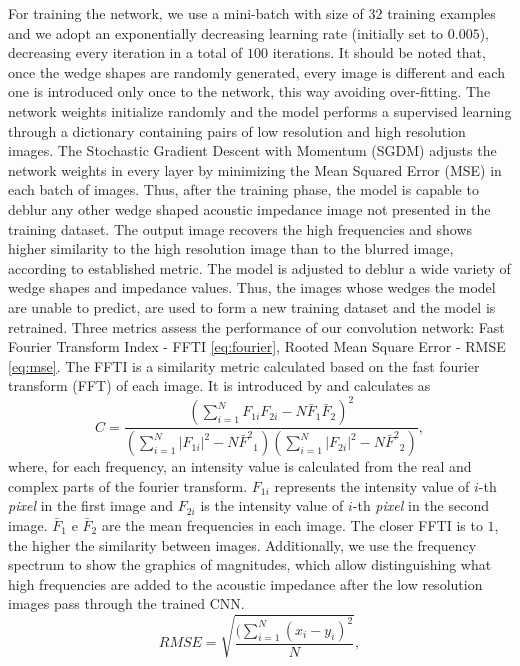 \documentclass[conference]{IEEEtran}
\begin{document}
For training the network, we use a mini-batch with size of $32$ training examples
and we adopt an exponentially decreasing learning rate (initially
set to $0.005$), decreasing every iteration in a total of $100$ iterations.
It should be noted that, once the wedge shapes are randomly generated, every image is different
and each one is introduced only once to the network, this way avoiding over-fitting.
The network weights initialize randomly and the model performs a supervised learning through a dictionary containing pairs of low resolution and high resolution images.
The Stochastic Gradient Descent with Momentum (SGDM) \cite{Ning1999} adjusts the network weights in every layer by minimizing the Mean Squared Error (MSE)
in each batch of images. Thus, after the training phase, the model is capable
to deblur any other wedge shaped acoustic impedance image not presented in the training dataset. The output
image recovers the high frequencies and shows higher similarity
to the high resolution image than to the blurred image, according to established metric.
The model is adjusted to deblur a wide variety of wedge shapes and impedance values.
Thus, the images whose wedges the model are unable to predict, are used to form a new training dataset
and the model is retrained.
Three metrics assess the performance of our convolution network: Fast Fourier Transform Index - FFTI \eqref{eq:fourier},
Rooted Mean Square Error - RMSE \eqref{eq:mse}. 
The FFTI is a similarity metric calculated based on the fast fourier transform (FFT) of each image.
It is introduced by \cite{Naranyana2015} and calculates as 
\begin{equation}
 C = \frac{ (\sum_{i=1}^{N}{F_{1i}F_{2i}} - N \bar{F}_1\bar{F}_2 )^2 }{ (\sum_{i=1}^{N}{|F_{1i}|^2} - N{\bar{F}^2}_1)( \sum_{i=1}^{N}{|F_{2i}|^2} - N{\bar{F}^2}_2 )},
 \label{eq:fourier}
\end{equation}
where, for each frequency, an intensity value is calculated from the real and complex parts of the fourier
transform. $F_{1i}$ represents the intensity value of $i$-th \textit{pixel} in the first image and $F_{2i}$
is the intensity value of $i$-th \textit{pixel} in the second image. $\bar{F}_1$ e $\bar{F}_2$ are the mean
frequencies in each image. The closer FFTI is to $1$, the higher the similarity between images.
Additionally, we use the frequency spectrum to show the graphics of magnitudes, which allow distinguishing what high frequencies are added to the acoustic impedance after the low resolution images pass through the trained CNN. 
\begin{equation}
 RMSE = \sqrt{\frac{ (\sum_{i=1}^{N}{(x_i -y_i)^2 } }{N}},
 \label{eq:mse}
\end{equation}
\end{document}
